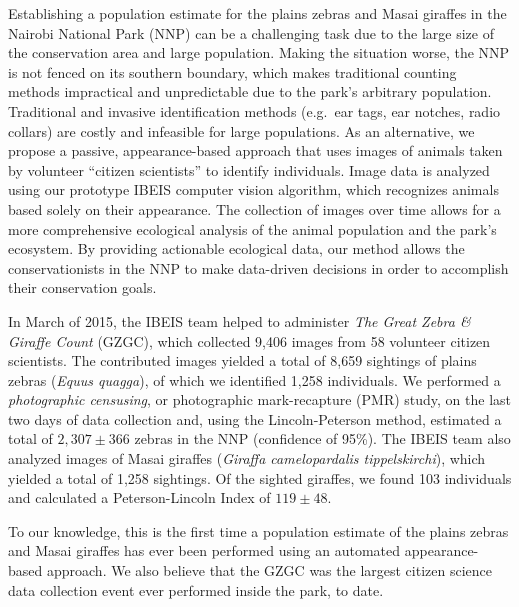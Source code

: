 

Establishing a population estimate for the plains zebras and Masai giraffes in the Nairobi National Park (NNP) can be a challenging task due to the large size of the conservation area and large population.  Making the situation worse, the NNP is not fenced on its southern boundary, which makes traditional counting methods impractical and unpredictable due to the park's arbitrary population.  Traditional and invasive identification methods (e.g.\ ear tags, ear notches, radio collars) are costly and infeasible for large populations.  As an alternative, we propose a passive, appearance-based approach that uses images of animals taken by volunteer ``citizen scientists'' to identify individuals.  Image data is analyzed using our prototype IBEIS computer vision algorithm, which recognizes animals based solely on their appearance.  The collection of images over time allows for a more comprehensive ecological analysis of the animal population and the park's ecosystem.   By providing actionable ecological data, our method allows the conservationists in the NNP to make data-driven decisions in order to accomplish their conservation goals.

In March of 2015, the IBEIS team helped to administer \textit{The Great Zebra \& Giraffe Count} (GZGC), which collected 9,406 images from 58 volunteer citizen scientists.  The contributed images yielded a total of 8,659 sightings of plains zebras (\textit{Equus quagga}), of which we identified 1,258 individuals.  We performed a \textit{photographic censusing}, or photographic mark-recapture (PMR) study, on the last two days of data collection and, using the Lincoln-Peterson method, estimated a total of $2,307 \pm 366$ zebras in the NNP (confidence of 95\%).  The IBEIS team also analyzed images of Masai giraffes (\textit{Giraffa camelopardalis tippelskirchi}), which yielded a total of 1,258 sightings.  Of the sighted giraffes, we found 103 individuals and calculated a Peterson-Lincoln Index of $119 \pm 48$.

To our knowledge, this is the first time a population estimate of the plains zebras and Masai giraffes has ever been performed using an automated appearance-based approach.  We also believe that the GZGC was the largest citizen science data collection event ever performed inside the park, to date.
